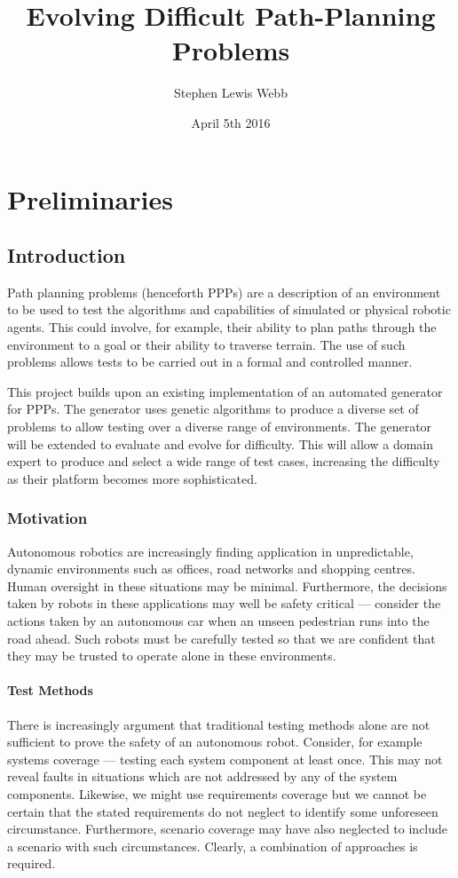 \documentclass[authoryearcitations]{UoYCSproject}
\author{Stephen Lewis Webb}
\title{Evolving Difficult Path-Planning Problems}
\date{April 5th 2016}
\begin{document}
\maketitle
\listoffigures
\listoftables


\part{Preliminaries}
\label{sec:start}
\chapter{Introduction}
\label{cha:Introduction}
Path planning problems (henceforth PPPs) are a description of an environment to be used to test the algorithms and capabilities of simulated or physical robotic agents. This could involve, for example, their ability to plan paths through the environment to a goal or their ability to traverse terrain. The use of such problems allows tests to be carried out in a formal and controlled manner.

This project builds upon an existing implementation of an automated generator for PPPs. The generator uses genetic algorithms to produce a diverse set of problems to allow testing over a diverse range of environments. The generator will be extended to evaluate and evolve for difficulty. This will allow a domain expert to produce and select a wide range of test cases, increasing the difficulty as their platform becomes more sophisticated.

\section{Motivation}
\label{sec:Motivation}
Autonomous robotics are increasingly finding application in unpredictable, dynamic environments such as offices, road networks and shopping centres. Human oversight in these situations may be minimal. Furthermore, the decisions taken by robots in these applications may well be safety critical --- consider the actions taken by an autonomous car when an unseen pedestrian runs into the road ahead. Such robots must be carefully tested so that we are confident that they may be trusted to operate alone in these environments.
\subsection{Test Methods}
\label{sec:test_methods}
There is increasingly argument that traditional testing methods alone are not sufficient to prove the safety of an autonomous robot. Consider, for example systems coverage --- testing each system component at least once. This may not reveal faults in situations which are not addressed by any of the system components. Likewise, we might use requirements coverage but we cannot be certain that the stated requirements do not neglect to identify some unforeseen circumstance. Furthermore, scenario coverage may have also neglected to include a scenario with such circumstances. Clearly, a combination of approaches is required.
\end{document}
